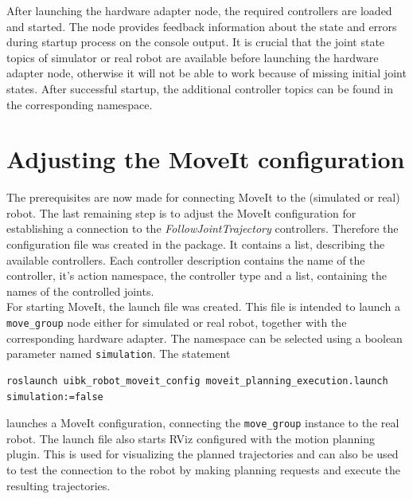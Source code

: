After launching the hardware adapter node, the required controllers are loaded and started. The node provides feedback information about the state and errors during startup process on the console output. It is crucial that the joint state topics of simulator or real robot are available before launching the hardware adapter node, otherwise it will not be able to work because of missing initial joint states. After successful startup, the additional controller topics can be found in the corresponding namespace.

\section{Adjusting the MoveIt configuration}

The prerequisites are now made for connecting MoveIt to the (simulated or real) robot. The last remaining step is to adjust the MoveIt configuration for establishing a connection to the \emph{FollowJointTrajectory} controllers. Therefore the configuration file  was created in the  package. It contains a list, describing the available controllers. Each controller description contains the name of the controller, it's action namespace, the controller type and a list, containing the names of the controlled joints.\\

For starting MoveIt, the launch file  was created. This file is intended to launch a \texttt{move\_group} node either for simulated or real robot, together with the corresponding hardware adapter. The namespace can be selected using a boolean parameter named \texttt{simulation}. The statement
{\small 
\begin{verbatim}
roslaunch uibk_robot_moveit_config moveit_planning_execution.launch simulation:=false
\end{verbatim}}
launches a MoveIt configuration, connecting the \texttt{move\_group} instance to the real robot. The launch file also starts RViz configured with the motion planning plugin. This is used for visualizing the planned trajectories and can also be used to test the connection to the robot by making planning requests and execute the resulting trajectories.